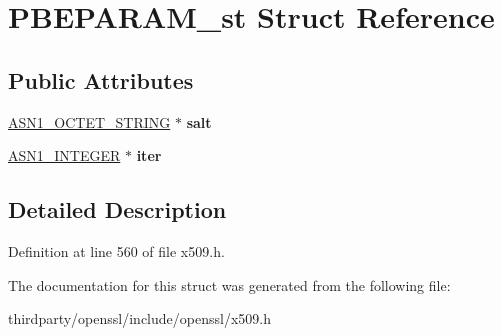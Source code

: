 \hypertarget{struct_p_b_e_p_a_r_a_m__st}{}\section{P\+B\+E\+P\+A\+R\+A\+M\+\_\+st Struct Reference}
\label{struct_p_b_e_p_a_r_a_m__st}
\subsection*{Public Attributes}
\begin{DoxyCompactItemize}
\item 
\mbox{\label{struct_p_b_e_p_a_r_a_m__st_ab7fbc3e560ddba64320f0fe268d6caec}} 
\hyperlink{structasn1__string__st}{A\+S\+N1\+\_\+\+O\+C\+T\+E\+T\+\_\+\+S\+T\+R\+I\+NG} $\ast$ {\bfseries salt}
\item 
\mbox{\label{struct_p_b_e_p_a_r_a_m__st_a4f47729d79e3dd79bf1ccef09157cd1d}} 
\hyperlink{structasn1__string__st}{A\+S\+N1\+\_\+\+I\+N\+T\+E\+G\+ER} $\ast$ {\bfseries iter}
\end{DoxyCompactItemize}


\subsection{Detailed Description}


Definition at line 560 of file x509.\+h.



The documentation for this struct was generated from the following file\+:\begin{DoxyCompactItemize}
\item 
thirdparty/openssl/include/openssl/x509.\+h\end{DoxyCompactItemize}
